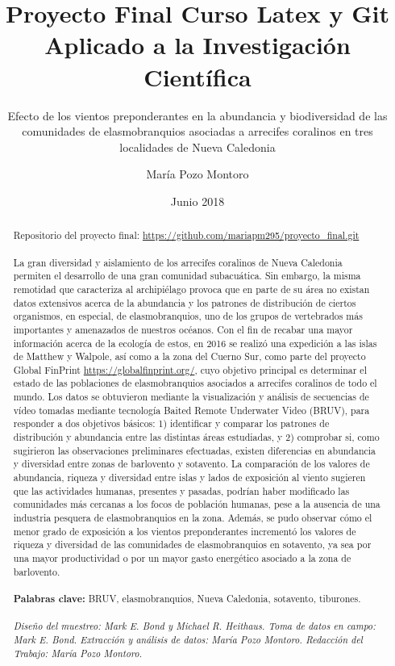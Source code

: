 \documentclass[a4paper, 11pt]{article}
\title{Proyecto Final Curso Latex y Git Aplicado a la Investigación Científica}
\subtitle{Efecto de los vientos preponderantes en la
abundancia y biodiversidad de las comunidades de
elasmobranquios asociadas a arrecifes coralinos
en tres localidades de Nueva Caledonia}
\author{María Pozo Montoro}
\date{{Junio 2018}}
\begin{document}
\maketitle
\newpage

\begin{abstract}
Repositorio del proyecto final: \url{https://github.com/mariapm295/proyecto_final.git} \\\\
La gran diversidad y aislamiento de los arrecifes coralinos de Nueva Caledonia permiten el desarrollo de una gran comunidad subacuática. Sin embargo, la misma remotidad que caracteriza al archipiélago provoca que en parte de su área no existan datos extensivos acerca de la abundancia y los patrones de distribución de ciertos organismos, en especial, de elasmobranquios, uno de los grupos de vertebrados más importantes y amenazados de nuestros océanos. Con el fin de recabar una mayor información acerca de la ecología de estos, en 2016 se realizó una expedición a las islas de Matthew y Walpole, así como a la zona del Cuerno Sur, como parte del proyecto Global FinPrint \url{https://globalfinprint.org/}, cuyo objetivo principal es determinar el estado de las poblaciones de elasmobranquios asociados a arrecifes coralinos de todo el mundo. Los datos se obtuvieron mediante la visualización y análisis de secuencias de vídeo tomadas mediante tecnología Baited Remote Underwater Video (BRUV), para responder a dos objetivos básicos: 1) identificar y comparar los patrones de distribución y abundancia entre las distintas áreas estudiadas, y 2) comprobar si, como sugirieron las observaciones preliminares efectuadas, existen diferencias en abundancia y diversidad entre zonas de barlovento y sotavento. La comparación de los valores de abundancia, riqueza y diversidad entre islas y lados de exposición al viento sugieren que las actividades humanas, presentes y pasadas, podrían haber modificado las comunidades más cercanas a los focos de población humanas, pese a la ausencia de una industria pesquera de elasmobranquios en la zona. Además, se pudo observar cómo el menor grado de exposición a los vientos preponderantes incrementó los valores de riqueza y diversidad de las comunidades de elasmobranquios en sotavento, ya sea por una mayor productividad o por un mayor gasto energético asociado a la zona de barlovento.\\\\

\textbf{Palabras clave:} BRUV, elasmobranquios, Nueva Caledonia, sotavento, tiburones.\\\\

\emph{Diseño del muestreo: Mark E. Bond y Michael R. Heithaus. Toma de datos en campo: Mark E. Bond. Extracción y análisis de datos: María Pozo Montoro. Redacción del Trabajo: María Pozo Montoro.}
\end{abstract}
\newpage
\end{document}
